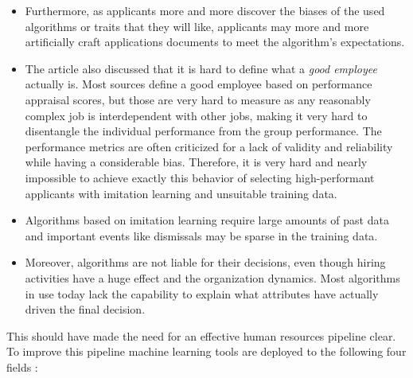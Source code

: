 \documentclass[draft,final]{thesisclass} %
\begin{document}
\begin{enumerate}
\begin{itemize}
        \item Furthermore, as applicants more and more discover the biases of the used algorithms or traits that they will like, applicants may more and more artificially craft applications documents to meet the algorithm's expectations.
        \item The article also discussed that it is hard to define what a \textit{good employee} actually is. Most sources define a good employee based on performance appraisal scores, but those are very hard to measure as any reasonably complex job is interdependent with other jobs, making it very hard to disentangle the individual performance from the group performance. The performance metrics are often criticized for a lack of validity and reliability while having a considerable bias. Therefore, it is very hard and nearly impossible to achieve exactly this behavior of selecting high-performant applicants with imitation learning and unsuitable training data.
        \item Algorithms based on imitation learning require large amounts of past data and important events like dismissals may be sparse in the training data.
        \item Moreover, algorithms are not liable for their decisions, even though  hiring activities have a huge effect and the organization dynamics. Most algorithms in use today lack the capability to explain what attributes have actually driven the final decision.
    \end{itemize}
\end{enumerate}
This should have made the need for an effective human resources pipeline clear. To improve this pipeline machine learning tools are deployed to the following four fields \parencite[4-8]{ai_recruiting}:
\end{document}
